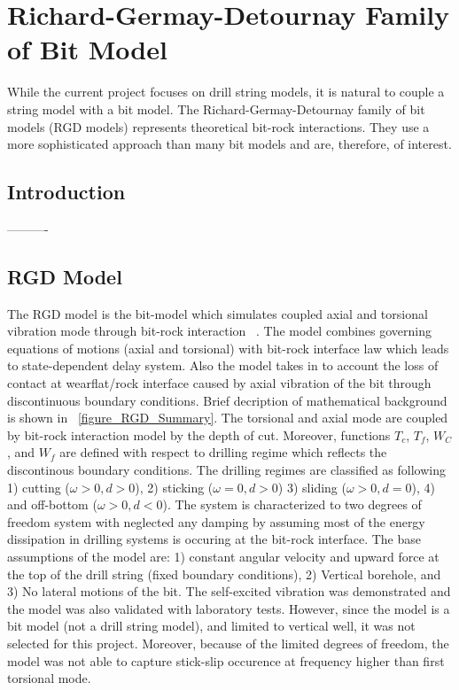 \section{Richard-Germay-Detournay Family of Bit Model}
\label{ch:rgdmodels}
While the current project focuses on drill string models, it is natural to couple a string model with a bit model. The Richard-Germay-Detournay family of bit models (RGD models) represents theoretical bit-rock interactions.  They use a more sophisticated approach than many bit models and are, therefore, of interest.
\subsection{Introduction}
----------

\subsection{RGD Model}
The RGD model is the bit-model which simulates coupled axial and torsional vibration mode through bit-rock interaction ~\cite{ref:richard2007a}. The model combines governing equations of motions (axial and torsional) with bit-rock interface law which leads to state-dependent delay system. Also the model takes in to account the loss of contact at wearflat/rock interface caused by axial vibration of the bit through discontinuous boundary conditions. Brief decription of mathematical background is shown in \figurename~\ref{figure_RGD_Summary}. The torsional and axial mode are coupled by bit-rock interaction model by the depth of cut. Moreover, functions $T_c$, $T_f$, $W_C$, and $W_f$ are defined with respect to drilling regime which reflects the discontinous boundary conditions. The drilling regimes are classified as following 1) cutting ($\omega>0, d>0$), 2) sticking ($\omega=0, d>0$) 3) sliding ($\omega>0, d=0$), 4) and off-bottom ($\omega>0, d<0$). The system is characterized to two degrees of freedom system with neglected any damping by assuming most of the energy dissipation in drilling systems is occuring at the bit-rock interface. The base assumptions of the model are: 1) constant angular velocity and upward force at the top of the drill string (fixed boundary conditions), 2) Vertical borehole, and 3) No lateral motions of the bit. The self-excited vibration was demonstrated and the model was also validated with laboratory tests. However, since the model is a bit model (not a drill string model), and limited to vertical well, it was not selected for this project. Moreover, because of the limited degrees of freedom, the model was not able to capture stick-slip occurence at frequency higher than first torsional mode. 


